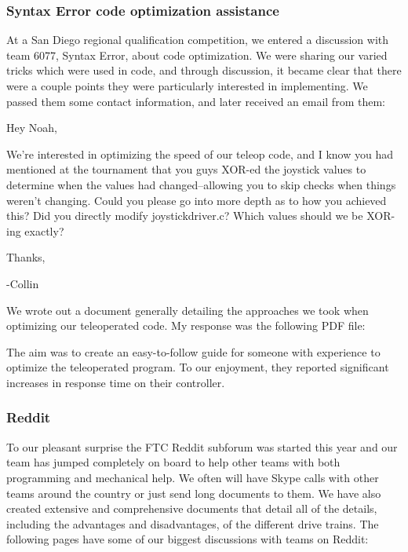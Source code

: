 \subsubsection{Syntax Error code optimization assistance}

At a San Diego regional qualification competition, we entered a discussion with team 6077, Syntax Error, about code optimization. We were sharing our varied tricks which were used in code, and through discussion, it became clear that there were a couple points they were particularly interested in implementing. We passed them some contact information, and later received an email from them:

\begin{fancyquotes}
Hey Noah,

We're interested in optimizing the speed of our teleop code, and I know you had mentioned at the tournament that you guys XOR-ed the joystick values to determine when the values had changed--allowing you to skip checks when things weren't changing. Could you please go into more depth as to how you achieved this? Did you directly modify joystickdriver.c? Which values should we be XOR-ing exactly?

Thanks,

-Collin 
\end{fancyquotes}

We wrote out a document generally detailing the approaches we took when optimizing our teleoperated code. My response was the following PDF file:



The aim was to create an easy-to-follow guide for someone with experience to optimize the teleoperated program. To our enjoyment, they reported significant increases in response time on their controller.

\subsubsection{Reddit}
To our pleasant surprise the FTC Reddit subforum was started this year and our team has jumped completely on board to help other teams with both programming and mechanical help. We often will have Skype calls with other teams around the country or just send long documents to them. We have also created extensive and comprehensive documents that detail all of the details, including the advantages and disadvantages, of the different drive trains. The following pages have some of our biggest discussions with teams on Reddit:

